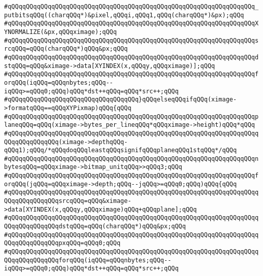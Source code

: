 \verb|#qQQqqQQqqQQqqQQqqQQqqQQqqQQqqQQqqQQqqQQqqQQqqQQqqQQqqQQqqQQqqQQqqQQq_putbitsqQQq((charqQQq*)&pixel,qQQqi,qQQq1,qQQq(charqQQq*)&px);qQQq|\newline
\verb|#qQQqqQQqqQQqqQQqqQQqqQQqqQQqqQQqqQQqqQQqqQQqqQQqqQQqqQQqqQQqqQQqqQQqXYNORMALIZE(&px,qQQqximage);qQQq|\newline
\verb|#qQQqqQQqqQQqqQQqqQQqqQQqqQQqqQQqqQQqqQQqqQQqqQQqqQQqqQQqqQQqqQQqqQQqsrcqQQq=qQQq(charqQQq*)qQQq&px;qQQq|\newline
\verb|#qQQqqQQqqQQqqQQqqQQqqQQqqQQqqQQqqQQqqQQqqQQqqQQqqQQqqQQqqQQqqQQqqQQqdstqQQq=qQQq&ximage->data[XYINDEX(x,qQQqy,qQQqximage)];qQQq|\newline
\verb|#qQQqqQQqqQQqqQQqqQQqqQQqqQQqqQQqqQQqqQQqqQQqqQQqqQQqqQQqqQQqqQQqqQQqforqQQq(iqQQq=qQQqnbytes;qQQq--iqQQq>=qQQq0;qQQq)qQQq*dst++qQQq=qQQq*src++;qQQq|\newline
\verb|#qQQqqQQqqQQqqQQqqQQqqQQqqQQqqQQqqQQq}qQQqelseqQQqifqQQq(ximage->formatqQQq==qQQqXYPixmap)qQQq{qQQq|\newline
\verb|#qQQqqQQqqQQqqQQqqQQqqQQqqQQqqQQqqQQqqQQqqQQqqQQqqQQqqQQqqQQqqQQqqQQqplaneqQQq=qQQq(ximage->bytes_per_lineqQQq*qQQqximage->height)qQQq*qQQq|\newline
\verb|#qQQqqQQqqQQqqQQqqQQqqQQqqQQqqQQqqQQqqQQqqQQqqQQqqQQqqQQqqQQqqQQqqQQqqQQqqQQqqQQqqQQq(ximage->depthqQQq-qQQq1);qQQq/*qQQqdoqQQqleastqQQqsignifqQQqplaneqQQq1stqQQq*/qQQq|\newline
\verb|#qQQqqQQqqQQqqQQqqQQqqQQqqQQqqQQqqQQqqQQqqQQqqQQqqQQqqQQqqQQqqQQqqQQqnbytesqQQq=qQQqximage->bitmap_unitqQQq>>qQQq3;qQQq|\newline
\verb|#qQQqqQQqqQQqqQQqqQQqqQQqqQQqqQQqqQQqqQQqqQQqqQQqqQQqqQQqqQQqqQQqqQQqforqQQq(jqQQq=qQQqximage->depth;qQQq--jqQQq>=qQQq0;qQQq)qQQq{qQQq|\newline
\verb|#qQQqqQQqqQQqqQQqqQQqqQQqqQQqqQQqqQQqqQQqqQQqqQQqqQQqqQQqqQQqqQQqqQQqqQQqqQQqqQQqqQQqsrcqQQq=qQQq&ximage->data[XYINDEX(x,qQQqy,qQQqximage)qQQq+qQQqplane];qQQq|\newline
\verb|#qQQqqQQqqQQqqQQqqQQqqQQqqQQqqQQqqQQqqQQqqQQqqQQqqQQqqQQqqQQqqQQqqQQqqQQqqQQqqQQqqQQqdstqQQq=qQQq(charqQQq*)qQQq&px;qQQq|\newline
\verb|#qQQqqQQqqQQqqQQqqQQqqQQqqQQqqQQqqQQqqQQqqQQqqQQqqQQqqQQqqQQqqQQqqQQqqQQqqQQqqQQqqQQqpxqQQq=qQQq0;qQQq|\newline
\verb|#qQQqqQQqqQQqqQQqqQQqqQQqqQQqqQQqqQQqqQQqqQQqqQQqqQQqqQQqqQQqqQQqqQQqqQQqqQQqqQQqqQQqforqQQq(iqQQq=qQQqnbytes;qQQq--iqQQq>=qQQq0;qQQq)qQQq*dst++qQQq=qQQq*src++;qQQq|\newline
